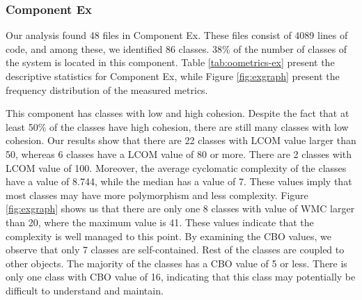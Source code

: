 \subsubsection{Component Ex}
Our analysis found 48 files in Component Ex. These files consist of 4089 lines of code, and among these, we identified 86 classes. 38\% of the number of classes of the system is located in this component. Table \ref{tab:oometrics-ex} present the descriptive statistics for Component Ex, while Figure \ref{fig:exgraph} present the frequency distribution of the measured metrics. 

This component has classes with low and high cohesion. Despite the fact that at least 50\% of the classes have high cohesion, there are still many classes with low cohesion. Our results show that there are 22 classes with LCOM value larger than 50, whereas 6 classes have a LCOM value of 80 or more. There are 2 classes with LCOM value of 100. Moreover, the average cyclomatic complexity of the classes have a value of 8.744, while the median has a value of 7. These values imply that most classes may have more polymorphism and less complexity. Figure \ref{fig:exgraph} shows us that there are only one 8 classes with value of WMC larger than 20, where the maximum value is 41. These values indicate that the complexity is well managed to this point. By examining the CBO values, we observe that only 7 classes are self-contained. Rest of the classes are coupled to other objects. The majority of the classes has a CBO value of 5 or less. There is only one class with CBO value of 16, indicating that this class may potentially be difficult to understand and maintain. 

